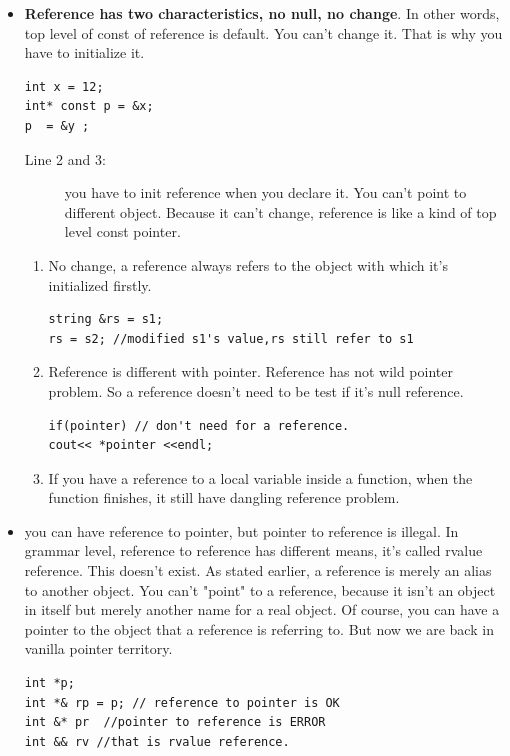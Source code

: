 \documentclass[a4paper,11pt,twoside]{book}
\begin{document}
\begin{itemize}
\item \textbf{Reference has two characteristics, no null, no change}. In other words, top level of const of reference is default. You can't change it. That is why you have to initialize it.
\begin{lstlisting}
int x = 12;
int* const p = &x; 
p  = &y ; 
\end{lstlisting}
\begin{description}
	\item[Line 2 and 3:] you have to init reference when you declare it. You can't point to different object. Because it can't change, reference is like a kind of top level const pointer.
\end{description}

\begin{enumerate}
\item No change, a reference always refers to the object with which it's initialized firstly.
\begin{lstlisting}[numbers = none]
string &rs = s1;
rs = s2; //modified s1's value,rs still refer to s1
\end{lstlisting}

\item Reference is different with pointer. Reference has not wild pointer problem. So a reference doesn't need to be test if it's null reference.
\begin{lstlisting}[numbers=none]
if(pointer) // don't need for a reference.
cout<< *pointer <<endl;
\end{lstlisting}

\item If you have a reference to a local variable inside a function, when the function finishes, it still have dangling reference problem. 
\end{enumerate}

\item you can have reference to pointer, but pointer to reference is illegal. In grammar level, reference to reference has different means, it's called rvalue reference. This doesn't exist. As stated earlier, a reference is merely an alias to another object. You can't "point" to a reference, because it isn't an object in itself but merely another name for a real object. Of course, you can have a pointer to the object that a reference is referring to. But now we are back in vanilla pointer territory.
\begin{lstlisting}[numbers=none]
int *p;
int *& rp = p; // reference to pointer is OK
int &* pr  //pointer to reference is ERROR
int && rv //that is rvalue reference.
\end{lstlisting}



\end{itemize}
\end{document}
